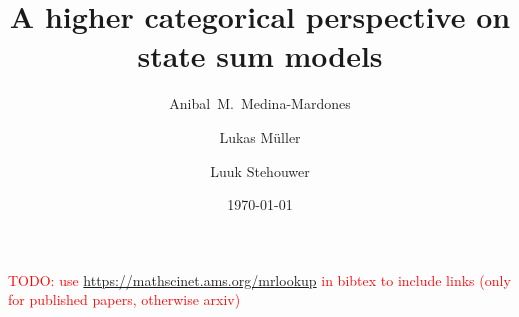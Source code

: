 \documentclass{amsart}
\title{A higher categorical perspective on state sum models}
\author[Medina-Mardones]{Anibal~M.~Medina-Mardones}
\author[Müller]{Lukas Müller}
\author[Stehouwer]{Luuk Stehouwer}
\date{\today}
\begin{document}
	
	\maketitle
	
	
    
 	
    
    
   	
   
    
	\sloppy
 \textcolor{red}{TODO: use \url{https://mathscinet.ams.org/mrlookup} in bibtex to include links (only for published papers, otherwise arxiv)}
	\printbibliography
	\todos
\end{document}
